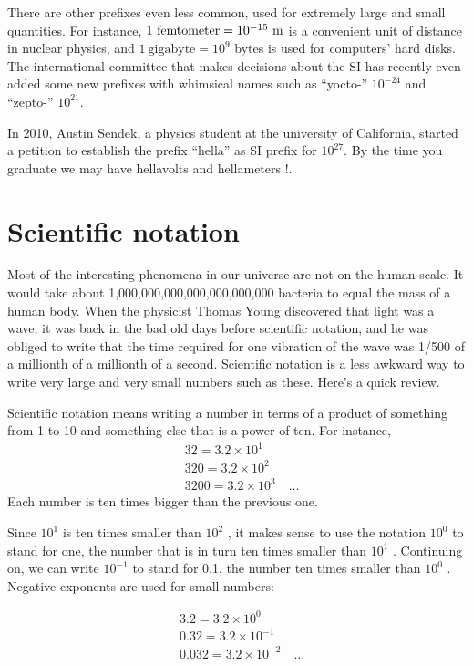There are other prefixes even less common, used for
extremely large and small quantities.  For instance,
$1\ \text{femtometer}=10^{-15}\ \munit$ is a convenient unit of distance in
nuclear physics, and $1\ \text{gigabyte}=10^9$  bytes is used for
computers' hard disks.  The international committee that
makes decisions about the SI has recently even added some
new prefixes with whimsical names such as  ``yocto-'' $10^{-24}$ and ``zepto-'' $10^{21}$. 

In 2010, Austin Sendek, a physics student at the university of California,  started a petition to establish the prefix ``hella''  as SI prefix for $10^{27}$.  By the time you graduate we may have hellavolts and hellameters !.

\section{Scientific notation}\label{sec:scientific-notation}


Most of the interesting phenomena in our universe
are not on the human scale. It would take about 1,000,000,000,000,000,000,000
bacteria to equal the mass of a human body. When the
physicist Thomas Young discovered that light was a wave, it
was back in the bad old days before scientific notation, and
he was obliged to write that the time required for one
vibration of the wave was 1/500 of a millionth of a
millionth of a second. Scientific notation is a less awkward
way to write very large and very small numbers such as
these.  Here's a quick review.

Scientific notation means writing a number in terms of a
product of something from 1 to 10 and something else that is
a power of ten. For instance,
\begin{align*}
& 32 = 3.2 \times 10^1\\
& 320 =  3.2 \times 10^2\\
& 3200 = 3.2 \times 10^3  \quad\ldots
\end{align*}
Each number is ten times bigger than the previous one.

Since $10^1$  is ten times smaller than $10^2$ , it makes
sense to use the notation $10^0$  to stand for one, the
number that is in turn ten times smaller than $10^1$ .
Continuing on, we can write $10^{-1}$  to stand for 0.1, the
number ten times smaller than $10^0$ . Negative exponents
are used for small numbers:

\begin{align*}
&3.2 =  3.2 \times 10^0\\
&0.32 = 3.2 \times 10^{-1}\\
&0.032 = 3.2 \times 10^{-2} \quad\ldots
\end{align*}

